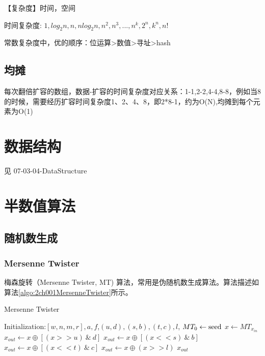 \documentclass[UTF8]{../computerUniverse}
\begin{document}
【复杂度】时间，空间

时间复杂度: $1,log_2n,n,nlog_2n,n^2,n^3,...,n^k,2^n,k^n,n!$


常数复杂度中，优的顺序：位运算>数值>寻址>hash

\section{均摊}
每次翻倍扩容的数组，数据-扩容的时间复杂度对应关系：1-1,2-2,4-4,8-8，例如当8的时候，需要经历扩容时间复杂度1、2、4、8，即2*8-1，约为O(N),均摊到每个元素为O(1)



\chapter{数据结构} %

见 07-03-04-DataStructure


\chapter{半数值算法}


\section{随机数生成}

\subsection{Mersenne Twister}
梅森旋转（Mersenne Twister, MT) 算法，常用是伪随机数生成算法。算法描述如算法\ref{algo:2ch001MersenneTwister}所示。

      \begin{algorithm}[ht]
        \caption{Mersenne Twister}\label{algo:2ch001MersenneTwister}
        \SetAlgoLined
        Initialization:$[w, n, m, r], a, f$,$(u,d),(s,b),(t,c),l$, $MT_0 \leftarrow {\rm seed}$\;
        $x \leftarrow MT_{x_{in}}$\;
        $x_{out} \leftarrow x \oplus [ (x >> u) \ \& \  d]$\;
        $x_{out} \leftarrow x \oplus [ (x << s) \ \& \ b]$\;
        $x_{out} \leftarrow x \oplus [ (x << t) \ \& \  c]$\;
        $x_{out} \leftarrow x \oplus  (x >> l) $\;
        \KwRet $x_{out}$\;
      \end{algorithm}
\end{document}
